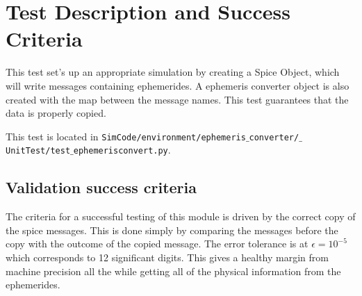 \section{Test Description and Success Criteria}

This test set's up an appropriate simulation by creating a Spice Object, which will write messages containing ephemerides. A ephemeris converter object is also created with the map between the message names. This test guarantees that the data is properly copied.

This test is located in {\tt SimCode/environment/ephemeris$\_$converter/$\_$UnitTest/test$\_$ephemerisconvert.py}. \par

\subsection{Validation success criteria }

The criteria for a successful testing of this module is driven by the correct copy of the spice messages. This is done simply by comparing the messages before the copy with the outcome of the copied message. The error tolerance is at $\epsilon =10^{-5}$ which corresponds to 12 significant digits. This gives a healthy margin from machine precision all the while getting all of the physical information from the ephemerides. 